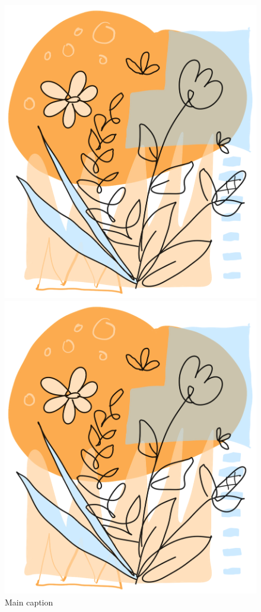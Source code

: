 \begin{figure}[ht]
\centering
\begin{minipage}[b]{\linewidth}
  \centering
  \includegraphics[width=0.4\linewidth]{Chapters/Chapter_3/figures/Image3_1a.PNG}
\end{minipage}

\begin{minipage}[b]{\linewidth}
  \centering
  \includegraphics[width=0.4\linewidth]{Chapters/Chapter_3/figures/Image3_1b.PNG}
\end{minipage}
\caption{Main caption}
\label{fig:figure3_1}
\end{figure}







